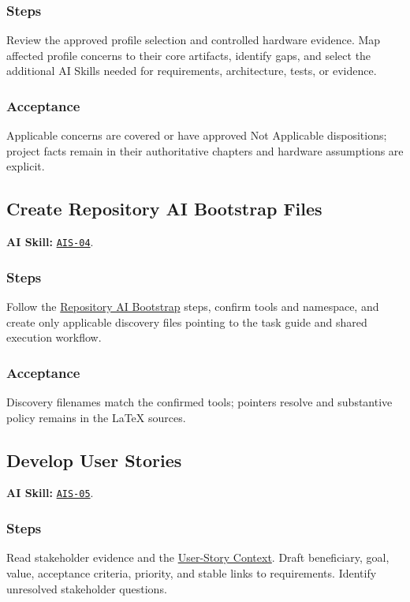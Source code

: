 \subsubsection*{Steps}
\label{Section:AIEmbeddedTaskSteps}
Review the approved profile selection and controlled hardware evidence. Map affected profile concerns to their core artifacts, identify gaps, and select the additional AI Skills needed for requirements, architecture, tests, or evidence.

\subsubsection*{Acceptance}
\label{Section:AIEmbeddedAcceptance}
Applicable concerns are covered or have approved Not Applicable dispositions; project facts remain in their authoritative chapters and hardware assumptions are explicit.

\subsection{Create Repository AI Bootstrap Files}
\label{Section:AIBootstrapSteps}
\noindent\textbf{AI Skill:} \hyperref[Skill:AIS-04]{\texttt{AIS-04}}.

\subsubsection*{Steps}
\label{Section:AIBootstrapTaskSteps}
Follow the \hyperref[Section:AIRepositoryBootstrap]{Repository AI Bootstrap} steps, confirm tools and namespace, and create only applicable discovery files pointing to the task guide and shared execution workflow.

\subsubsection*{Acceptance}
\label{Section:AIBootstrapAcceptance}
Discovery filenames match the confirmed tools; pointers resolve and substantive policy remains in the LaTeX sources.

\subsection{Develop User Stories}
\label{Section:AIStorySteps}
\noindent\textbf{AI Skill:} \hyperref[Skill:AIS-05]{\texttt{AIS-05}}.

\subsubsection*{Steps}
\label{Section:AIStoryTaskSteps}
Read stakeholder evidence and the \hyperref[Section:AIUserStoryContext]{User-Story Context}. Draft beneficiary, goal, value, acceptance criteria, priority, and stable links to requirements. Identify unresolved stakeholder questions.

